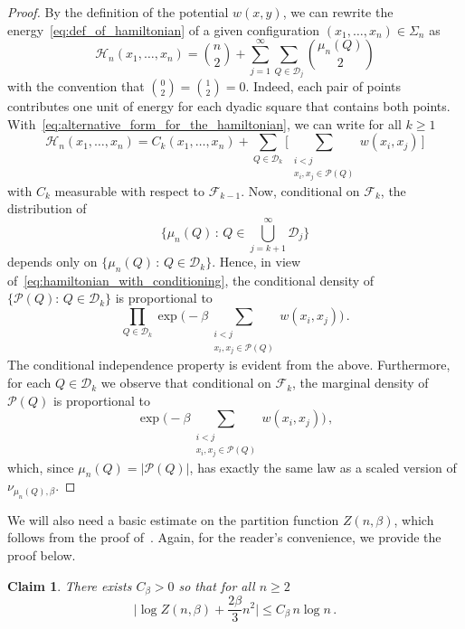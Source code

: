\documentclass[11pt]{amsart}
\newtheorem{claim}[theorem]{Claim}
\theoremstyle{definition}
\theoremstyle{remark}
\numberwithin{equation}{section}
\begin{document}
		\begin{proof}
		By the definition of the potential $w(x,y)$, we can rewrite the energy~\eqref{eq:def_of_hamiltonian} of a given configuration $(x_1,\ldots,x_n)\in \Sigma_n$ as
		\begin{equation}
			\label{eq:alternative_form_for_the_hamiltonian}
			\mathcal{H}_n(x_1,\ldots,x_n) = \binom{n}{2} + \sum_{j=1}^{\infty} \sum_{Q\in \mathcal{D}_j} \binom{\mu_n(Q)}{2}
		\end{equation}
		with the convention that $\binom{0}{2} = \binom{1}{2} = 0$. Indeed, each pair of points contributes one unit of energy for each dyadic square that contains both points.
		With~\eqref{eq:alternative_form_for_the_hamiltonian}, we can write for all $k\ge 1$
		\begin{equation}
			\label{eq:hamiltonian_with_conditioning}
			\mathcal{H}_n(x_1,\ldots,x_n) = C_k(x_1,\ldots,x_n) + \sum_{Q \in \mathcal{D}_k} \Big[\sum_{\substack{i<j \\ x_i,x_j\in \mathcal P(Q)}} w(x_i,x_j) \, \Big]
		\end{equation}
		with $C_k$ measurable with respect to $\mathcal{F}_{k-1}$. Now, conditional on $\mathcal{F}_k$, the distribution of $$\big\{\mu_n(Q) \, : \, Q\in \bigcup_{j=k+1}^{\infty} \mathcal{D}_j\big\}$$ depends only on $\big\{\mu_n(Q) \, : \, Q \in \mathcal{D}_k \big\}.$ Hence, in view of~\eqref{eq:hamiltonian_with_conditioning}, the conditional density of $\{ \mathcal{P}(Q) : \, Q \in \mathcal{D}_k\}$ is proportional to
		\begin{equation*}
			\prod_{Q \in \mathcal{D}_k} \exp\bigg(-\beta \sum_{\substack{i<j \\ x_i,x_j\in \mathcal P(Q)}} w(x_i,x_j) \bigg)\, .
		\end{equation*} 
		The conditional independence property is evident from the above. Furthermore, for each $Q\in \mathcal{D}_k$ we observe that conditional on $\mathcal{F}_k$, the marginal density of $\mathcal{P}(Q)$ is proportional to
		\[
		\exp\bigg(-\beta \sum_{\substack{i<j \\ x_i,x_j\in \mathcal P(Q)}} w(x_i,x_j) \bigg) \, , 
		\]
		which, since $\mu_n(Q) = |\mathcal P(Q)|$, has exactly the same law as a scaled version of $\nu_{\mu_n(Q),\beta}$.
	\end{proof}
	We will also need a basic estimate on the partition function $Z(n,\beta)$, which follows from the proof of~\cite[Lemma 3.3]{chatterjee}. Again, for the reader's convenience, we provide the proof below.
	\begin{claim}
		\label{claim:estimates_on_partition_function}
		There exists $C_\beta>0$ so that for all $n\ge 2$
		\[
		\Big|\log Z(n,\beta) + \frac{2\beta}{3} n^2\Big| \le C_\beta \, n\log n\, .
		\]
	\end{claim}
\end{document}
